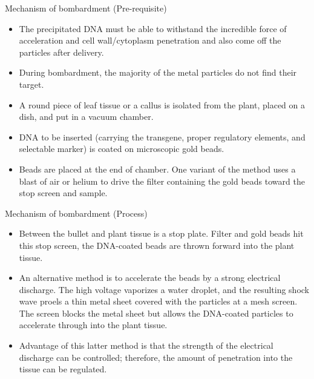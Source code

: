 \documentclass[11pt,dvipsnames,ignorenonframetext,aspectratio=169]{beamer}
\providecommand{\tightlist}{%
  \setlength{\itemsep}{0pt}\setlength{\parskip}{0pt}}
\begin{document}
\begin{frame}{Mechanism of bombardment (Pre-requisite)}
\protect\hypertarget{mechanism-of-bombardment-pre-requisite}{}
\begin{itemize}
\tightlist
\item
  The precipitated DNA must be able to withstand the incredible force of
  acceleration and cell wall/cytoplasm penetration and also come off the
  particles after delivery.
\item
  During bombardment, the majority of the metal particles do not find
  their target.
\item
  A round piece of leaf tissue or a callus is isolated from the plant,
  placed on a dish, and put in a vacuum chamber.
\item
  DNA to be inserted (carrying the transgene, proper regulatory
  elements, and selectable marker) is coated on microscopic gold beads.
\item
  Beads are placed at the end of chamber. One variant of the method uses
  a blast of air or helium to drive the filter containing the gold beads
  toward the stop screen and sample.
\end{itemize}
\end{frame}

\begin{frame}{Mechanism of bombardment (Process)}
\protect\hypertarget{mechanism-of-bombardment-process}{}
\begin{itemize}
\tightlist
\item
  Between the bullet and plant tissue is a stop plate. Filter and gold
  beads hit this stop screen, the DNA-coated beads are thrown forward
  into the plant tissue.
\item
  An alternative method is to accelerate the beads by a strong
  electrical discharge. The high voltage vaporizes a water droplet, and
  the resulting shock wave proels a thin metal sheet covered with the
  particles at a mesh screen. The screen blocks the metal sheet but
  allows the DNA-coated particles to accelerate through into the plant
  tissue.
\item
  Advantage of this latter method is that the strength of the electrical
  discharge can be controlled; therefore, the amount of penetration into
  the tissue can be regulated.
\end{itemize}
\end{frame}
\end{document}
